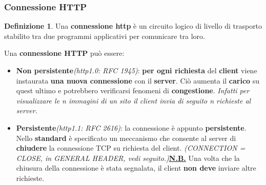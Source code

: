 \documentclass[11pt,a4paper,oneside]{book}
\theoremstyle{definition}
\newtheorem{definition}{Definizione}[section]
\begin{document}
\subsubsection{Connessione HTTP}
\begin{definition}
	Una \textbf{connessione http} è  un circuito logico di livello di trasporto stabilito tra due programmi applicativi per comunicare tra loro.
\end{definition}
Una \textbf{connessione HTTP} può essere:
\begin{itemize}
	\item \textbf{Non persistente}\textit{(http1.0: RFC 1945)}:  \textbf{per ogni richiesta} del \textbf{client} viene instaurata \textbf{una nuova connessione} con il \textbf{server}. Ciò aumenta il \textbf{carico} su quest ultimo e potrebbero verificarsi fenomeni di \textbf{congestione}. \textit{Infatti per visualizzare le n immagini di un sito il client invia di seguito n richieste al server.}
	\item \textbf{Persistente}\textit{(http1.1: RFC 2616)}: la connessione è appunto \textbf{persistente}. Nello \textbf{standard} è specificato un meccanismo che consente al server di \textbf{chiudere} la connessione TCP su richiesta del client. \textit{(CONNECTION = CLOSE, in GENERAL HEADER, vedi seguito.)}\newline \textbf{\underline{N.B.}} Una volta che la chiusura della connessione è stata segnalata, il client \textbf{non deve} inviare altre richieste.
\end{itemize}

\pagebreak
\end{document}
